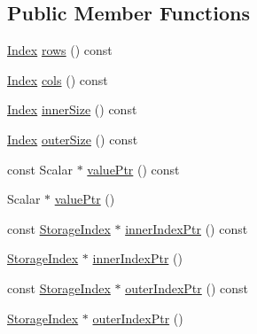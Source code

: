 \subsection*{Public Member Functions}
\begin{DoxyCompactItemize}
\item 
\mbox{\hyperlink{struct_eigen_1_1_eigen_base_a554f30542cc2316add4b1ea0a492ff02}{Index}} \mbox{\hyperlink{class_eigen_1_1_sparse_matrix_a62e61bb861eee306d5b069ce652b5aa5}{rows}} () const
\item 
\mbox{\hyperlink{struct_eigen_1_1_eigen_base_a554f30542cc2316add4b1ea0a492ff02}{Index}} \mbox{\hyperlink{class_eigen_1_1_sparse_matrix_aa391750e3c530227e4a5c3c52e959975}{cols}} () const
\item 
\mbox{\hyperlink{struct_eigen_1_1_eigen_base_a554f30542cc2316add4b1ea0a492ff02}{Index}} \mbox{\hyperlink{class_eigen_1_1_sparse_matrix_a0f42824d4a06ee1d1f6afbc4551c5896}{inner\+Size}} () const
\item 
\mbox{\hyperlink{struct_eigen_1_1_eigen_base_a554f30542cc2316add4b1ea0a492ff02}{Index}} \mbox{\hyperlink{class_eigen_1_1_sparse_matrix_a4e5f706cfae14d2eaec1ea1e234905f1}{outer\+Size}} () const
\item 
const Scalar $\ast$ \mbox{\hyperlink{class_eigen_1_1_sparse_matrix_a9d4354d3f4d121d764bbed33cac05329}{value\+Ptr}} () const
\item 
Scalar $\ast$ \mbox{\hyperlink{class_eigen_1_1_sparse_matrix_ac2684952b14b5c9b0f68ae3bb8c517a6}{value\+Ptr}} ()
\item 
const \mbox{\hyperlink{class_eigen_1_1_sparse_matrix_base_a0b540ba724726ebe953f8c0df06081ed}{Storage\+Index}} $\ast$ \mbox{\hyperlink{class_eigen_1_1_sparse_matrix_ae7b804bd39745156d20ca1611a296b67}{inner\+Index\+Ptr}} () const
\item 
\mbox{\hyperlink{class_eigen_1_1_sparse_matrix_base_a0b540ba724726ebe953f8c0df06081ed}{Storage\+Index}} $\ast$ \mbox{\hyperlink{class_eigen_1_1_sparse_matrix_a8e9ef5d399d36fdd860ad05cb7a31455}{inner\+Index\+Ptr}} ()
\item 
const \mbox{\hyperlink{class_eigen_1_1_sparse_matrix_base_a0b540ba724726ebe953f8c0df06081ed}{Storage\+Index}} $\ast$ \mbox{\hyperlink{class_eigen_1_1_sparse_matrix_a75506964d86d6badb32d0b4917acf2e2}{outer\+Index\+Ptr}} () const
\item 
\mbox{\hyperlink{class_eigen_1_1_sparse_matrix_base_a0b540ba724726ebe953f8c0df06081ed}{Storage\+Index}} $\ast$ \mbox{\hyperlink{class_eigen_1_1_sparse_matrix_a9451af2795c1a5b97678272475e41422}{outer\+Index\+Ptr}} ()

\end{DoxyCompactItemize}
